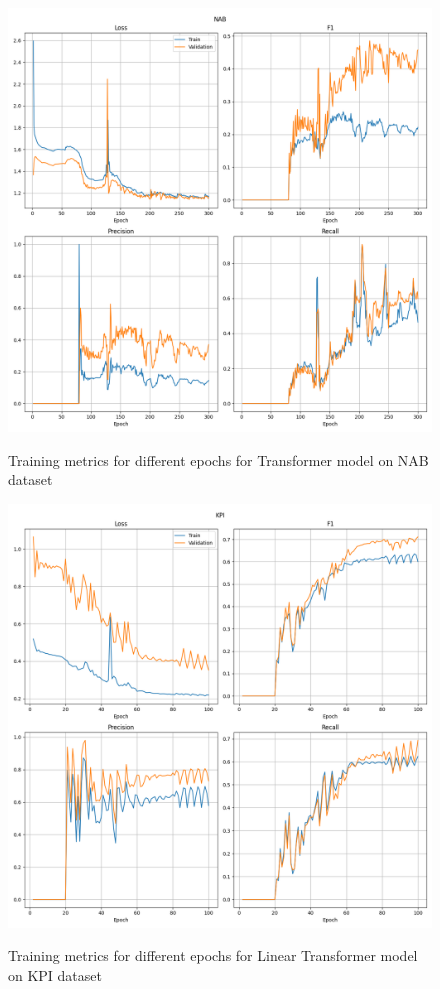 \documentclass[a4paper, twoside]{report}
\theoremstyle{definition}
\numberwithin{equation}{section}
\begin{document}
\begin{figure}[h!]
    \centering
    \caption{Training metrics for different epochs for Transformer model on NAB dataset}
    \includegraphics[width=\textwidth]{plots/Transformer_NAB.png}
    \label{fig:Transformer_NAB_training}
\end{figure}

\begin{figure}[h!]
    \centering
    \caption{Training metrics for different epochs for Linear Transformer model on KPI dataset}
    \includegraphics[width=\textwidth]{plots/LinearTransformer_KPI.png}
    \label{fig:LinearTransformer_KPI_training}
\end{figure}
\end{document}
